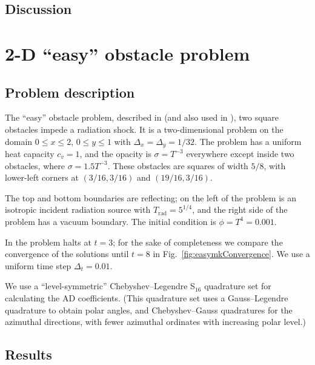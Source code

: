 \subsection{Discussion}

\clearpage
\section{2-D \texorpdfstring{``easy''}{easy} obstacle problem}

\subsection{Problem description}

The ``easy'' obstacle problem, described in \cite{Mou2006} (and also used in
\cite{Kno2007}), two square obstacles impede a radiation shock. It is a
two-dimensional problem on the domain $0 \le x \le 2$, $0 \le y \le 1$ with
$\Delta_x=\Delta_y=1/32$. The
problem has a uniform heat capacity $c_v = 1$, and the opacity is
$\sigma=T^{-3}$ everywhere except inside two obstacles, where $\sigma= 1.5
T^{-3}$. These obstacles are squares of width $5/8$, with lower-left corners
at $(3/16, 3/16)$ and $(19/16, 3/16)$.

The top and bottom boundaries are reflecting; on the left of the problem is an
isotropic incident radiation source with $T_\text{rad} = 5^{1/4}$, and the right
side of the problem has a vacuum boundary. The initial condition is $\phi =
T^{4} = 0.001$.

In \cite{Mou2006} the problem halts at $t=3$; for the sake of completeness we
compare the convergence of the solutions until $t=8$ in
Fig.~\ref{fig:easymkConvergence}. We use a uniform time step $\Delta_t=0.01$.

We use a ``level-symmetric'' Chebyshev--Legendre S$_{16}$ quadrature set for
calculating the AD coefficients. (This quadrature set uses a Gauss--Legendre
quadrature to obtain polar angles, and Chebyshev--Gauss quadratures for the
azimuthal directions, with fewer azimuthal ordinates with increasing polar
level.)

\subsection{Results}

\begin{figure}[htb]
  \centering
  \label{fig:easymkContour}
\end{figure}

